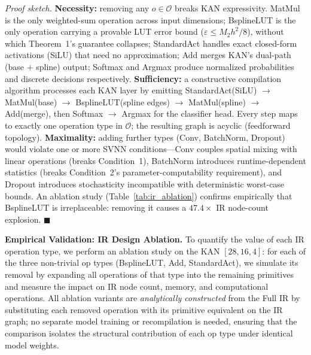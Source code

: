 \documentclass[journal,onecolumn]{IEEEtran}
\begin{document}
\vspace{2pt}
\noindent\textit{Proof sketch.}
\textbf{Necessity:} removing any $o \in \mathcal{O}$ breaks KAN
expressivity. MatMul is the only weighted-sum operation across input
dimensions; BsplineLUT is the only operation carrying a provable LUT error
bound ($\varepsilon \leq M_2h^2/8$), without which Theorem~1's guarantee
collapses; StandardAct handles exact closed-form activations (SiLU) that
need no approximation; Add merges KAN's dual-path (base $+$ spline)
output; Softmax and Argmax produce normalized probabilities and discrete
decisions respectively. \textbf{Sufficiency:} a constructive compilation
algorithm processes each KAN layer by emitting StandardAct(SiLU)
$\to$ MatMul(base) $\to$ BsplineLUT(spline edges) $\to$ MatMul(spline)
$\to$ Add(merge), then Softmax $\to$ Argmax for the classifier head. Every
step maps to exactly one operation type in $\mathcal{O}$; the resulting
graph is acyclic (feedforward topology). \textbf{Maximality:} adding
further types (Conv, BatchNorm, Dropout) would violate one or more SVNN
conditions---Conv couples spatial mixing with linear operations (breaks
Condition~1), BatchNorm introduces runtime-dependent statistics (breaks
Condition~2's parameter-computability requirement), and Dropout introduces
stochasticity incompatible with deterministic worst-case bounds. An
ablation study (Table~\ref{tab:ir_ablation}) confirms empirically that
BsplineLUT is irreplaceable: removing it causes a $47.4\times$ IR
node-count explosion. \hfill $\blacksquare$

\vspace{2pt}
\noindent\textbf{Empirical Validation: IR Design Ablation.}
To quantify the value of each IR operation type, we perform an ablation
study on the KAN $[28,16,4]$: for each of the three non-trivial op types
(BsplineLUT, Add, StandardAct), we simulate its removal by expanding all
operations of that type into the remaining primitives and measure the
impact on IR node count, memory, and computational operations.
       All ablation variants are \emph{analytically constructed} from the
       Full IR by substituting each removed operation with its primitive
       equivalent on the IR graph; no separate model training or recompilation
       is needed, ensuring that the comparison isolates the structural
       contribution of each op type under identical model weights.
\end{document}
